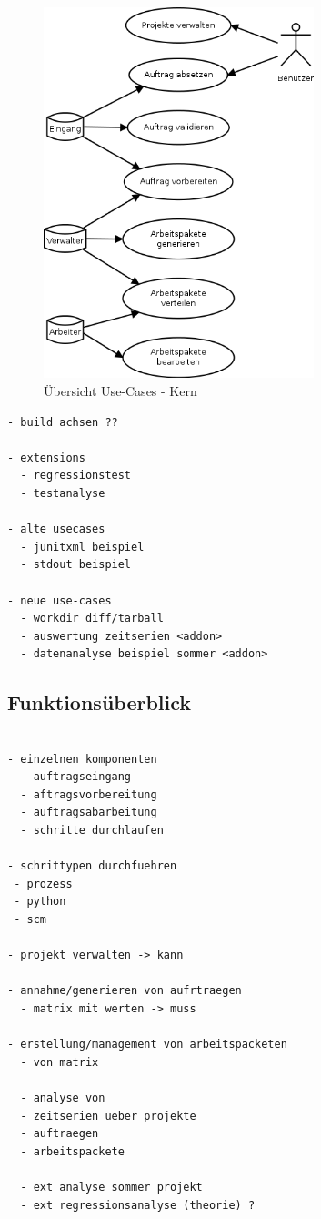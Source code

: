 \begin{figure}[ht]
  \centering
  \label{fig:use-case-muss}
  \includegraphics[width=0.7\textwidth]{imageinput/use-case-muss.png}
  \caption{\"Ubersicht Use-Cases - Kern}
\end{figure}




\begin{verbatim}
- build achsen ??

- extensions
  - regressionstest
  - testanalyse

- alte usecases
  - junitxml beispiel
  - stdout beispiel

- neue use-cases
  - workdir diff/tarball
  - auswertung zeitserien <addon>
  - datenanalyse beispiel sommer <addon>
\end{verbatim}


\subsection{Funktions\"uberblick}



\begin{verbatim}

- einzelnen komponenten
  - auftragseingang
  - aftragsvorbereitung
  - auftragsabarbeitung
  - schritte durchlaufen

- schrittypen durchfuehren
 - prozess
 - python
 - scm

- projekt verwalten -> kann

- annahme/generieren von aufrtraegen
  - matrix mit werten -> muss

- erstellung/management von arbeitspacketen
  - von matrix

  - analyse von
  - zeitserien ueber projekte
  - auftraegen
  - arbeitspackete

  - ext analyse sommer projekt
  - ext regressionsanalyse (theorie) ?
\end{verbatim}

